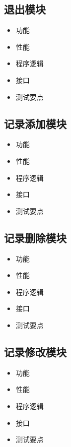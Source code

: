 	\subsection{退出模块}
	\begin{itemize}
		\item 功能
		\item 性能
		\item 程序逻辑
		\item 接口
		\item 测试要点
	\end{itemize}
	\subsection{记录添加模块}
	\begin{itemize}
		\item 功能
		\item 性能
		\item 程序逻辑
		\item 接口
		\item 测试要点
	\end{itemize}
	\subsection{记录删除模块}
	\begin{itemize}
		\item 功能
		\item 性能
		\item 程序逻辑
		\item 接口
		\item 测试要点
	\end{itemize}
	\subsection{记录修改模块}
	\begin{itemize}
		\item 功能
		\item 性能
		\item 程序逻辑
		\item 接口
		\item 测试要点
	\end{itemize}
